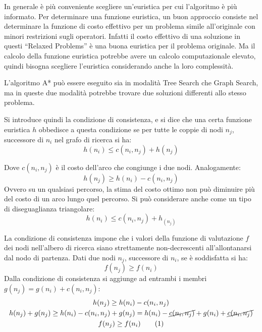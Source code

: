 \documentclass{article}
\numberwithin{equation}{subsection}
\newcommand{\tageq}{\tag{\stepcounter{equation}\theequation}}
\begin{document}

In generale è più conveniente scegliere un'euristica per cui l'algoritmo è più informato. Per determinare una funzione euristica, un buon approccio consiste nel 
determinare la funzione di costo effettivo per un problema simile all'originale con minori restrizioni sugli operatori. Infatti il costo effettivo di una soluzione 
in questi ``Relaxed Problems'' è una buona euristica per il problema originale. Ma il calcolo della funzione euristica potrebbe avere un calcolo computazionale 
elevato, quindi bisogna scegliere l'euristica considerando anche la loro complessità.  

L'algoritmo A* può essere eseguito sia in modalità Tree Search che Graph Search, ma in queste due modalità potrebbe trovare due soluzioni differenti allo stesso 
problema. 

Si introduce quindi la condizione di consistenza, e si dice che una certa funzione euristica $h$ 
obbedisce a questa condizione se per tutte le coppie di nodi $n_j$, successore di $n_i$ nel grafo di 
ricerca si ha:
\begin{equation}
    h(n_i)\leq c(n_i,n_j)+h(n_j)
\end{equation}

Dove $c(n_i,n_j)$ è il costo dell'arco che congiunge i due nodi. 
Analogamente:
\begin{equation*}
    h(n_j)\geq h(n_i)-c(n_i,n_j)
\end{equation*}
Ovvero su un qualsiasi percorso, la stima del costo ottimo non può diminuire più del costo di un arco 
lungo quel percorso. Si può considerare anche come un tipo di diseguaglianza triangolare:
\begin{equation*}
    h(n_i)\leq c(n_i,n_j)+h_(n_j)
\end{equation*}


La condizione di consistenza impone che i valori della funzione di valutazione $f$ dei nodi 
nell'albero di ricerca siano strettamente non-decrescenti all'allontanarsi dal nodo di 
partenza. Dati due nodi $n_j$, successore di $n_i$, se è soddisfatta si ha:
\begin{equation*}
    f(n_j)\geq f(n_i)
\end{equation*}
Dalla condizione di consistenza si aggiunge ad entrambi i membri $g(n_j)=g(n_i)+c(n_i,n_j)$:
\begin{gather*}
    h(n_j)\geq h(n_i)-c(n_i,n_j)\\
    h(n_j)+g(n_j)\geq h(n_i)-c(n_i,n_j)+g(n_j)=h(n_i)-\cancel{c(n_i,n_j)}+g(n_i)+\cancel{c(n_i,n_j)}\\
    f(n_j)\geq f(n_i)\tageq
\end{gather*}
\end{document}
